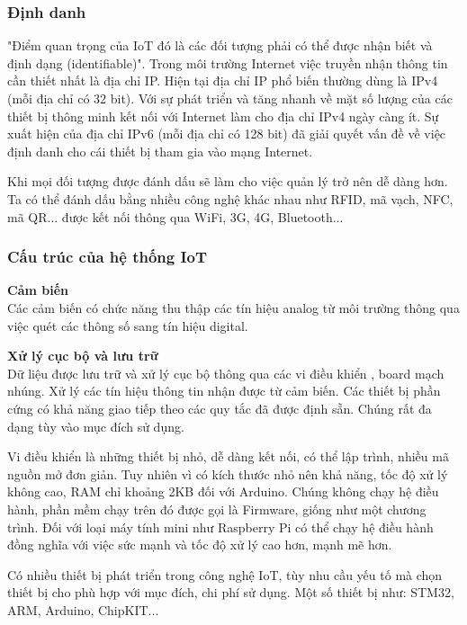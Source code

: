 \documentclass[a4paper,12pt,oneside]{article}
\begin{document}
\subsubsection{Định danh}

\noindent "Điểm quan trọng của IoT đó là các đối tượng phải có thể được nhận biết và định dạng (identifiable)"\cite{iot}. Trong môi trường Internet việc truyền nhận thông tin cần thiết nhất là địa chỉ IP. Hiện tại địa chỉ IP phổ biến thường dùng là IPv4 (mỗi địa chỉ có 32 bit). Với sự phát triển và tăng nhanh về mặt số lượng của các thiết bị thông minh kết nối với Internet làm cho địa chỉ IPv4 ngày càng ít. Sự xuất hiện của địa chỉ IPv6 (mỗi địa chỉ có 128 bit) đã giải quyết vấn đề về việc định danh cho cái thiết bị tham gia vào mạng Internet. 

\noindent Khi mọi đối tượng được đánh dấu sẽ làm cho việc quản lý trở nên dễ dàng hơn. Ta có thể đánh dấu bằng nhiều công nghệ khác nhau như RFID, mã vạch, NFC, mã QR... được kết nối thông qua WiFi, 3G, 4G, Bluetooth...

\subsubsection{Cấu trúc của hệ thống IoT}

\noindent \textbf{Cảm biến}\\
\noindent Các cảm biến có chức năng thu thập các tín hiệu analog từ môi trường thông qua việc quét các thông số sang tín hiệu digital.

\noindent \textbf{Xử lý cục bộ và lưu trữ}\\
\noindent Dữ liệu được lưu trữ và xử lý cục bộ thông qua các vi điều khiển , board mạch nhúng. Xử lý các tín hiệu thông tin nhận được từ cảm biến. Các thiết bị phần cứng có khả năng giao tiếp theo các quy tắc đã được định sẵn. Chúng rất đa dạng tùy vào mục đích sử dụng.

\noindent Vi điều khiển là những thiết bị nhỏ, dễ dàng kết nối, có thể lập trình, nhiều mã nguồn mở đơn giản. Tuy nhiên vì có kích thước nhỏ nên khả năng, tốc độ xử lý không cao, RAM chỉ khoảng 2KB đối với Arduino. Chúng không chạy hệ điều hành, phần mềm chạy trên đó được gọi là Firmware, giống như một chương trình. Đối với loại máy tính mini như Raspberry Pi có thể chạy hệ điều hành đồng nghĩa với việc sức mạnh và tốc độ xử lý cao hơn, mạnh mẽ hơn.

\noindent Có nhiều thiết bị phát triển trong công nghệ IoT, tùy nhu cầu yếu tố mà chọn thiết bị cho phù hợp với mục đích, chi phí sử dụng. Một số thiết bị như: 	STM32, ARM, Arduino, ChipKIT...
\end{document}
